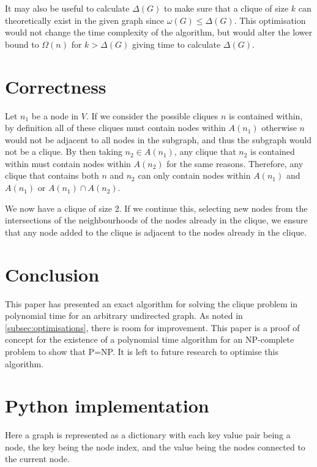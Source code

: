 \documentclass[11pt]{article}
\begin{document}
It may also be useful to calculate $\Delta(G)$ to make sure that a clique of size $k$ can theoretically exist in the given graph since $\omega(G)\leq\Delta(G)$. This optimisation would not change the time complexity of the algorithm, but would alter the lower bound to $\Omega(n)$ for $k>\Delta(G)$ giving time to calculate $\Delta(G)$.

\section{Correctness}

Let $n_1$ be a node in $V$. If we consider the possible cliques $n$ is contained within, by definition all of these cliques must contain nodes within $A(n_1)$ otherwise $n$ would not be adjacent to all nodes in the subgraph, and thus the subgraph would not be a clique. By then taking $n_2\in A(n_1)$, any clique that $n_2$ is contained within must contain nodes within $A(n_2)$ for the same reasons. Therefore, any clique that contains both $n$ and $n_2$ can only contain nodes within $A(n_1)$ and $A(n_1)$ or $A(n_1)\cap A(n_2)$.

We now have a clique of size 2. If we continue this, selecting new nodes from the intersections of the neighbourhoods of the nodes already in the clique, we ensure that any node added to the clique is adjacent to the nodes already in the clique.

\section{Conclusion}

This paper has presented an exact algorithm for solving the clique problem in polynomial time for an arbitrary undirected graph. As noted in \cref{subsec:optimisations}, there is room for improvement. This paper is a proof of concept for the existence of a polynomial time algorithm for an NP-complete problem to show that P=NP. It is left to future research to optimise this algorithm.

\appendix
\section{Python implementation}
\label{apdx:a}
Here a graph is represented as a dictionary with each key value pair being a node, the key being the node index, and the value being the nodes connected to the current node.


\end{document}
